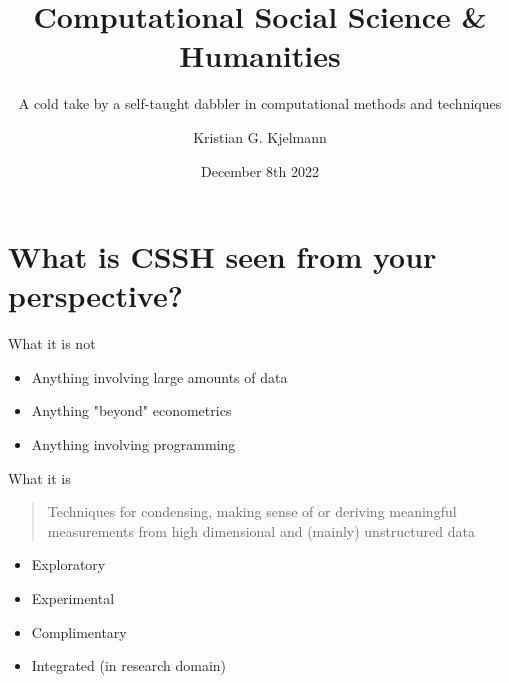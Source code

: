 \documentclass[10pt]{beamer}
\title{Computational Social Science \& Humanities}
\subtitle{A cold take by a self-taught dabbler in computational methods and techniques}
\date{December 8th 2022}
\author{Kristian G. Kjelmann}
\institute{Department of Sociology \& Social Work}
\begin{document}
\maketitle


\section{What is CSSH seen from your perspective?}

\begin{frame}[fragile]{What it is not}

    \begin{itemize}
        \item Anything involving large amounts of data
        \item Anything "beyond" econometrics
        \item Anything involving programming
    \end{itemize}
  
\end{frame}

\begin{frame}[fragile]{What it is}

\begin{quote}
    Techniques for \alert{condensing}, \alert{making sense of} or \alert{deriving meaningful measurements} from \alert{high dimensional} and (mainly) \alert{unstructured data} 
\end{quote}

    \begin{itemize}[<+- | alert@+>]
        \item Exploratory
        \item Experimental
        \item Complimentary
        \item Integrated (in research domain)
    \end{itemize}
  
\end{frame}
\end{document}

